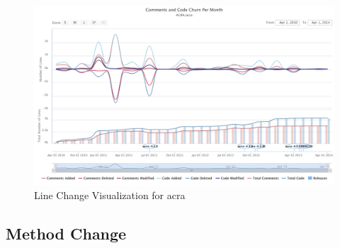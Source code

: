 \begin{landscape}
 \thispagestyle{empty}
 \begin{figure}
  \centering
        \includegraphics[width=1.5\textwidth]{images/lines_visual_acra}
    \caption{Line Change Visualization for acra}
    \label{fig:line_visual_acra}
 \end{figure}
\end{landscape}
\pagestyle{plain}

\subsection{Method Change}
\label{subsec:method_change}

